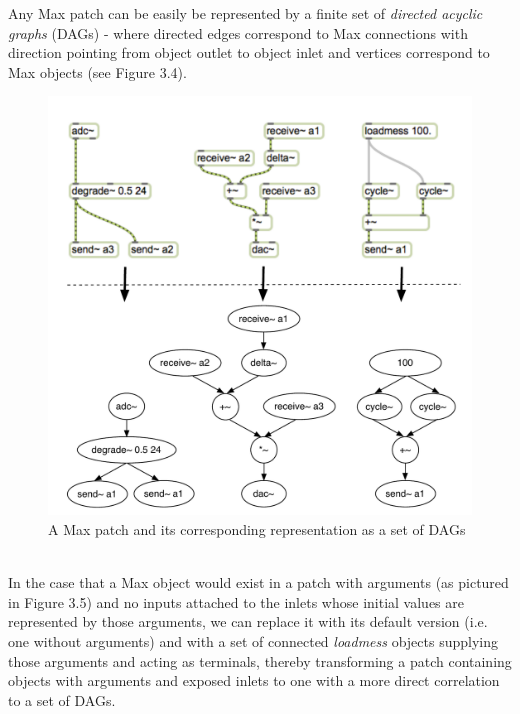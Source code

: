 \documentclass[a4paper,12pt]{report} 	%
\numberwithin{figure}{chapter}
\numberwithin{table}{chapter}
\numberwithin{equation}{chapter}
\begin{document}
\begin{flushleft}
Any Max patch can be easily be represented by a finite set of \emph{directed acyclic graphs} (DAGs) - where directed edges correspond to Max connections with direction pointing from object outlet to object inlet and vertices correspond to Max objects (see Figure 3.4).
\begin{figure}[h!]
\begin{center}
\includegraphics[scale=0.7]{MaxDAGs}
\caption[A Max Patch as a set of DAGs]{A Max patch and its corresponding representation as a set of DAGs}
\end{center}
\end{figure}
\\
In the case that a Max object would exist in a patch with arguments (as pictured in Figure 3.5) and no inputs attached to the inlets whose initial values are represented by those arguments, we can replace it with its default version (i.e. one without arguments) and with a set of connected \emph{loadmess} objects supplying those arguments and acting as terminals, thereby transforming a patch containing objects with arguments and exposed inlets to one with a more direct correlation to a set of DAGs.
\begin{figure}[h!]
\begin{center}

\end{center}
\end{figure}
\end{flushleft}
\end{document}
